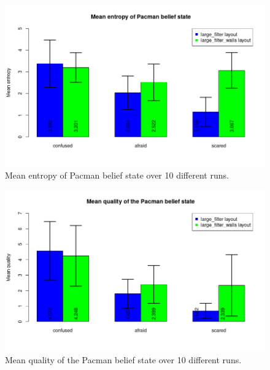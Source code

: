 \documentclass{article}
\begin{document}
\begin{enumerate}[label=\alph*.,leftmargin=*]
\begin{figure}[H]
    \centering
    \includegraphics[scale=0.75]{plots/pacman_belief_state.png} 
    \caption{Mean entropy of Pacman belief state over 10 different runs.}
\end{figure}

\begin{figure}[H]
    \centering
    \includegraphics[scale=0.75]{plots/differences.png} 
    \caption{Mean quality of the Pacman belief state over 10 different runs.}
\end{figure}
    

\end{enumerate}
\end{document}
